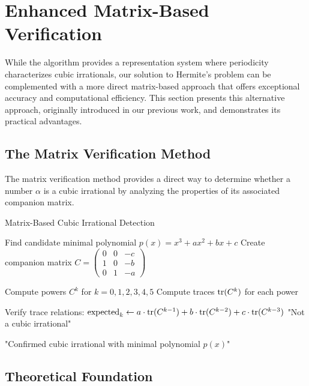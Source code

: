 \section{Enhanced Matrix-Based Verification}\label{sec:matrix_verification}

While the \HAPD{} algorithm provides a representation system where periodicity characterizes cubic irrationals, our solution to Hermite's problem can be complemented with a more direct matrix-based approach that offers exceptional accuracy and computational efficiency. This section presents this alternative approach, originally introduced in our previous work, and demonstrates its practical advantages.

\subsection{The Matrix Verification Method}

The matrix verification method provides a direct way to determine whether a number $\alpha$ is a cubic irrational by analyzing the properties of its associated companion matrix.

\begin{algorithm}
\caption{Matrix-Based Cubic Irrational Detection}
\label{alg:matrix_verification}
\begin{algorithmic}[1]
    \State Find candidate minimal polynomial $p(x) = x^3 + ax^2 + bx + c$
    \State Create companion matrix $C = \begin{pmatrix} 0 & 0 & -c \\ 1 & 0 & -b \\ 0 & 1 & -a \end{pmatrix}$
    
    \State Compute powers $C^k$ for $k = 0, 1, 2, 3, 4, 5$
    \State Compute traces $\operatorname{tr}(C^k)$ for each power
    
    \State Verify trace relations:
        \State $\text{expected}_k \gets a \cdot \operatorname{tr}(C^{k-1}) + b \cdot \operatorname{tr}(C^{k-2}) + c \cdot \operatorname{tr}(C^{k-3})$
            \State \Return "Not a cubic irrational"
        \EndIf
    \EndFor
    
    \State \Return "Confirmed cubic irrational with minimal polynomial $p(x)$"
\EndProcedure
\end{algorithmic}
\end{algorithm}

\subsection{Theoretical Foundation}

